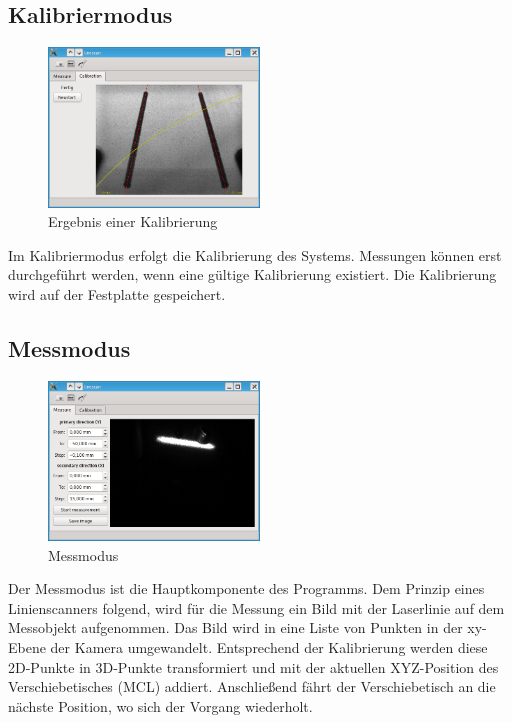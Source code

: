 \documentclass[a4paper,10pt]{scrartcl}
\begin{document}
\subsection{Kalibriermodus}

\begin{figure}[H]
  \centering
  \includegraphics[width=0.5\textwidth]{include/calib.png}
  \caption{Ergebnis einer Kalibrierung}
  \label{fig:overview}
\end{figure}

Im Kalibriermodus erfolgt die Kalibrierung des Systems. Messungen können erst durchgeführt werden,
wenn eine gültige Kalibrierung existiert. Die Kalibrierung wird auf der Festplatte gespeichert.

\subsection{Messmodus}

\begin{figure}[H]
  \centering
  \includegraphics[width=0.5\textwidth]{include/measure.png}
  \caption{Messmodus}
  \label{fig:overview}
\end{figure}

Der Messmodus ist die Hauptkomponente des Programms. Dem Prinzip eines Linienscanners folgend,
wird für die Messung ein Bild mit der Laserlinie auf dem Messobjekt aufgenommen. Das Bild wird
in eine Liste von Punkten in der xy-Ebene der Kamera umgewandelt. Entsprechend der Kalibrierung
werden diese 2D-Punkte in 3D-Punkte transformiert und mit der aktuellen XYZ-Position des
Verschiebetisches (MCL) addiert. Anschließend fährt der Verschiebetisch an die nächste Position,
wo sich der Vorgang wiederholt.
\end{document}
